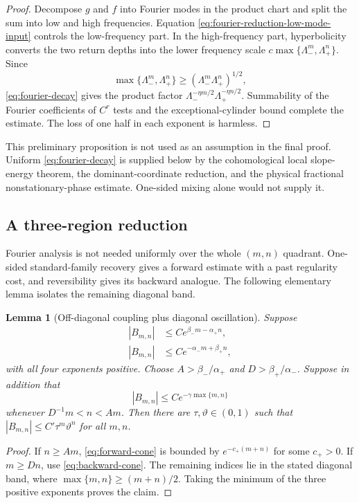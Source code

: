 \documentclass[11pt]{article}
\newtheorem{lemma}[theorem]{Lemma}
\begin{document}
\begin{proof}
Decompose $g$ and $f$ into Fourier modes in the product chart and split the
sum into low and high frequencies.  Equation
\eqref{eq:fourier-reduction-low-mode-input} controls the low-frequency part.
In the high-frequency part, hyperbolicity converts the
two return depths into the lower frequency scale
$c\max\{\Lambda_-^m,\Lambda_+^n\}$.  Since
\[
 \max\{\Lambda_-^m,\Lambda_+^n\}
 \ge (\Lambda_-^m\Lambda_+^n)^{1/2},
\]
\eqref{eq:fourier-decay} gives the product factor
$\Lambda_-^{-\eta m/2}\Lambda_+^{-\eta n/2}$.  Summability of the Fourier
coefficients of $C^r$ tests and the exceptional-cylinder bound complete the
estimate.  The loss of one half in each exponent is harmless.
\end{proof}

This preliminary proposition is not used as an assumption in the final proof.
Uniform \eqref{eq:fourier-decay} is supplied below by the cohomological
local slope-energy theorem, the dominant-coordinate reduction, and the
physical fractional nonstationary-phase estimate.  One-sided mixing alone
would not supply it.

\subsection{A three-region reduction}

Fourier analysis is not needed uniformly over the whole $(m,n)$ quadrant.
One-sided standard-family recovery gives a forward estimate with a past
regularity cost, and reversibility gives its backward analogue.  The following
elementary lemma isolates the remaining diagonal band.

\begin{lemma}[Off-diagonal coupling plus diagonal oscillation]
\label{lem:three-region}
Suppose
\begin{align}
 |B_{m,n}|&\le C e^{\beta_-m-\alpha_+n},\label{eq:forward-cone}\\
 |B_{m,n}|&\le C e^{-\alpha_-m+\beta_+n},\label{eq:backward-cone}
\end{align}
with all four exponents positive.  Choose
$A>\beta_-/\alpha_+$ and $D>\beta_+/\alpha_-$.  Suppose in addition that
\[
 |B_{m,n}|\le Ce^{-\gamma\max\{m,n\}}
\]
whenever $D^{-1}m<n<Am$.  Then there are
$\tau,\vartheta\in(0,1)$ such that
$|B_{m,n}|\le C'\tau^m\vartheta^n$ for all $m,n$.
\end{lemma}

\begin{proof}
If $n\ge Am$, \eqref{eq:forward-cone} is bounded by
$e^{-c_+(m+n)}$ for some $c_+>0$.  If $m\ge Dn$, use
\eqref{eq:backward-cone}.  The remaining indices lie in the stated diagonal
band, where $\max\{m,n\}\ge(m+n)/2$.  Taking the minimum of the three positive
exponents proves the claim.
\end{proof}
\end{document}

